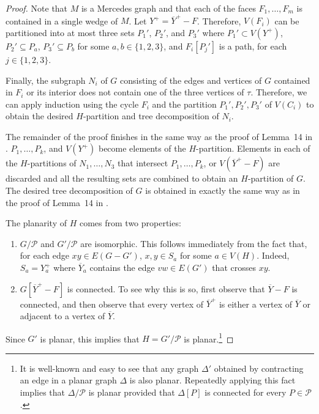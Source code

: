 \documentclass{patmorin}
\begin{document}
\begin{proof}
  Note that $M$ is a Mercedes graph and that each of the faces $F_1,\ldots,F_m$ is contained in a single wedge of $M$.   Let $Y^+ = \overline{Y}^+-F$. Therefore, $V(F_i)$ can be partitioned into at most three sets $P_1'$, $P_2'$, and $P_3'$ where $P_1'\subset V(Y^+)$, $P_2'\subseteq P_a$, $P_3'\subseteq P_b$ for some $a,b\in\{1,2,3\}$, and $F_i[P_j']$ is a path, for each $j\in\{1,2,3\}$. 

  Finally, the subgraph $N_i$ of $G$ consisting of the edges and vertices of $G$ contained in $F_i$ or its interior does not contain one of the three vertices of $\tau$. Therefore, we can apply induction using the cycle $F_i$ and the partition $P_1',P_2',P_3'$ of $V(C_i)$ to obtain the desired $H$-partition and tree decomposition of $N_i$.
  
  The remainder of the proof finishes in the same way as the proof of Lemma~14 in \cite{dujmovic.joret.ea:planar}.  $P_1,\ldots,P_k$, and $V(Y^+)$ become elements of the $H$-partition.  Elements in each of the $H$-partitions of $N_1,\ldots,N_3$ that intersect $P_1,\ldots,P_k$, or $V(\overline{Y}^+-F)$ are discarded and all the resulting sets are combined to obtain an $H$-partition of $G$.  The desired tree decomposition of $G$ is obtained in exactly the same way as in the proof of Lemma~14 in \cite{dujmovic.joret.ea:planar}.
  
  The planarity of $H$ comes from two properties:
  \begin{enumerate}
    \item $G/\mathcal{P}$ and $G'/\mathcal{P}$ are isomorphic.  This follows immediately from the fact that, for each edge $xy\in E(G-G')$, $x,y\in S_a$ for some $a\in V(H)$.  Indeed, $S_a=Y^+_a$ where $\overline{Y}_a$ contains the edge $vw\in E(G')$ that crosses $xy$. 
    
    \item $G[\overline{Y}^+-F]$ is connected. To see why this is so, first observe that $\overline{Y}-F$ is connected, and then observe that every vertex of $\overline{Y}^+$ is either a vertex of $\overline{Y}$ or adjacent to a vertex of $\overline{Y}$.
  \end{enumerate}
  Since $G'$ is planar, this implies that $H=G'/\mathcal{P}$ is planar.\footnote{It is well-known and easy to see that any graph $\Delta'$ obtained by contracting an edge in a planar graph $\Delta$ is also planar.  Repeatedly applying this fact implies that $\Delta/\mathcal{P}$ is planar provided that $\Delta[P]$ is connected for every $P\in\mathcal{P}$.}
\end{proof}
\end{document}
